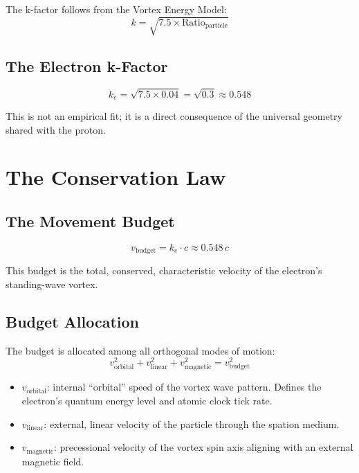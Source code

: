 The k-factor follows from the Vortex Energy Model:
\begin{equation}\label{eq:k-derive}
  k = \sqrt{7.5 \times \text{Ratio}_{\text{particle}}}
\end{equation}

\subsection{The Electron k-Factor}

\begin{equation}
  k_e = \sqrt{7.5 \times 0.04} = \sqrt{0.3} \approx 0.548
\end{equation}

This is not an empirical fit; it is a direct consequence of the universal geometry shared with the proton.


\section{The Conservation Law}

\subsection{The Movement Budget}

\begin{equation}\label{eq:budget}
  v_{\text{budget}} = k_e \cdot c \approx 0.548\,c
\end{equation}

This budget is the total, conserved, characteristic velocity of the electron's standing-wave vortex.

\subsection{Budget Allocation}

The budget is allocated among all orthogonal modes of motion:
\begin{equation}\label{eq:conservation}
  \boxed{v_{\text{orbital}}^2 + v_{\text{linear}}^2 + v_{\text{magnetic}}^2 = v_{\text{budget}}^2}
\end{equation}

\begin{itemize}
  \item $v_{\text{orbital}}$: internal ``orbital'' speed of the vortex wave pattern.  Defines the electron's quantum energy level and atomic clock tick rate.
  \item $v_{\text{linear}}$: external, linear velocity of the particle through the spation medium.
  \item $v_{\text{magnetic}}$: precessional velocity of the vortex spin axis aligning with an external magnetic field.
\end{itemize}

